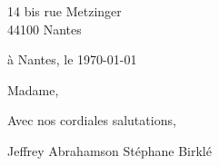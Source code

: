 \documentclass[12 pt]{article}
\begin{document}
14 bis rue Metzinger\\
44100 Nantes

\vspace{3mm}

\hbox{\hspace{.6\linewidth}\vtop{
}}

\vspace{1cm}

\hspace{.6\linewidth}à Nantes, le \today\\[2mm]
\vspace{1cm}

Madame,



Avec nos cordiales salutations,

\vspace{2cm}
Jeffrey Abrahamson \hspace{4cm} Stéphane Birklé
\end{document}
